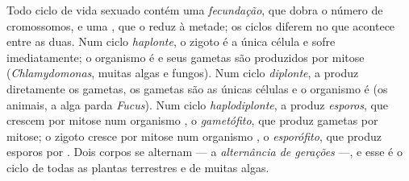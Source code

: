 \begin{definition}\label{def:b2:plant-life-cycles:cycles}
Todo ciclo de vida sexuado contém uma \emph{fecundação}, que dobra o
número de cromossomos, e uma \emph{}, que o reduz à metade; os
ciclos diferem no que acontece entre as duas. Num ciclo
\emph{haplonte}, o zigoto é a única célula  e sofre 
imediatamente; o organismo é  e seus gametas são produzidos
por mitose (\emph{Chlamydomonas}, muitas algas e fungos). Num ciclo
\emph{diplonte}, a  produz diretamente os gametas, os gametas
são as únicas células  e o organismo é  (os animais,
a alga parda \emph{Fucus}). Num ciclo \emph{haplodiplonte}, a 
produz \emph{esporos}, que crescem por mitose num organismo ,
o \emph{gametófito}, que produz gametas por mitose; o zigoto cresce
por mitose num organismo , o \emph{esporófito}, que produz
esporos por . Dois corpos  se alternam --- a
\emph{alternância de gerações} ---, e esse é o ciclo de todas as
plantas terrestres e de muitas algas.
\end{definition}

